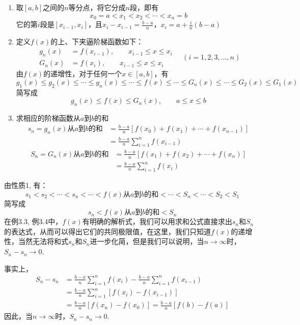 \begin{solution}
\begin{enumerate}
    \item     取$[a,b]$之间的$n$等分点，将它分成$n$段，即有
\[x_0=a<x_1<x_2<\cdots<x_n=b\]
它的第$i$段是$[x_{i-1},x_i]$，且$x_i-x_{i-1}=\frac{b-a}{n}$，$x_i=a+\frac{i}{n}(b-a)$

\item 定义$f(x)$的上、下夹逼阶梯函数如下：
\[
\begin{split}
    g_n(x)&=f(x_{i-1}),\qquad x_{i-1}\le x\le x_i \\
    G_n(x)&=f(x_i),\qquad x_{i-1}\le x\le x_i 
\end{split} \quad (i=1,2,3,\ldots,n)
\]
由$f(x)$的递增性，对于任何一个$x\in[a,b]$，有
\[g_1(x)\le g_2(x)\le\cdots \le g_n(x)\le\cdots \le f(x)\le \cdots\le G_n(x)\le\cdots\le G_2(x)\le G_1(x)\]
简写成
\[g_n(x)\le f(x)\le G_n(x),\qquad a\le x\le b\]
\item 求相应的阶梯函数从$a$到$b$的和
\begin{equation}
\begin{split}
    s_n=g_n(x)\text{从$a$到$b$的和}
    &=\frac{b-a}{n}\left[f(x_0)+f(x_1)+\cdots+f(x_{n-1})\right]\\
    &=\frac{b-a}{n}\sum^n_{i=1}f(x_{i-1})
\end{split}
\end{equation}
\begin{equation}
    \begin{split}
    S_n=G_n(x)\text{从$a$到$b$的和}
    &=\frac{b-a}{n}\left[f(x_1)+f(x_2)+\cdots+f(x_{n})\right]\\
    &=\frac{b-a}{n}\sum^n_{i=1}f(x_{i})   
    \end{split}
    \end{equation}
\end{enumerate}
由性质1, 有：
\[s_1<s_2<\cdots<s_n<\cdots<f(x)\text{从$a$到$b$的和}<\cdots<S_n<\cdots<S_2<S_1\]
简写成
\begin{equation}
    s_n<f(x)\text{从$a$到$b$的和}<S_n
\end{equation}
在例3.3, 例3.4中，$f(x)$有明确的解析式，我们可以用求和公式直接求出$s_n$和$S_n$的表达式，从而可以得出它们的共同极限值，在这里，我们只知道$f(x)$的递增性，当然无法将和式$s_n$和$S_n$进一步化简，但是我们可以说明，当$n\to\infty$时，$S_n-s_n\to 0$.

事实上，
\begin{align*}
    S_n-s_n&=\frac{b-a}{n}\sum^n_{i=1}f(x_{i})   -\frac{b-a}{n}\sum^n_{i=1}f(x_{i-1}) \\
    &=\frac{b-a}{n}\sum^n_{i=1}\left[f(x_{i})-f(x_{i-1})\right]   \\
    &=\frac{b-a}{n}\left[f(x_{n})-f(x_{0})\right]  =\frac{b-a}{n}\left[f(b)-f(a)\right]   
\end{align*}
因此，当$n\to\infty$时，$S_n-s_n\to 0$.


\end{solution}
